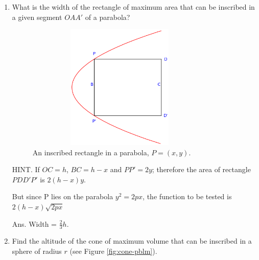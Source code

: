 \begin{enumerate}
\item
What is the width of the rectangle of maximum area that can 
be inscribed in a given segment $OAA'$ of a parabola?

\begin{figure}[h!]
\begin{minipage}{\textwidth}
\begin{center}
\includegraphics[height=6cm,width=9cm]{parabola-pblm3.eps}
\end{center}
\end{minipage}
\caption{An inscribed rectangle in a parabola, $P=(x,y)$.}
\label{fig:parabola-pblm}
\end{figure}

HINT. If $OC = h$, $BC = h - x$ and $PP' = 2y$; therefore the 
area of rectangle $PDD'P'$ is $2(h - x)y$.

But since P lies on the parabola $y^2 = 2px$, the function to be tested is
$2(h - x)\sqrt{2px}$

Ans. Width = $\frac{2}{3} h$.

\item
Find the altitude of the cone of maximum volume that can be 
inscribed in a sphere of radius $r$ (see Figure \ref{fig:cone-pblm}).


\end{enumerate}
